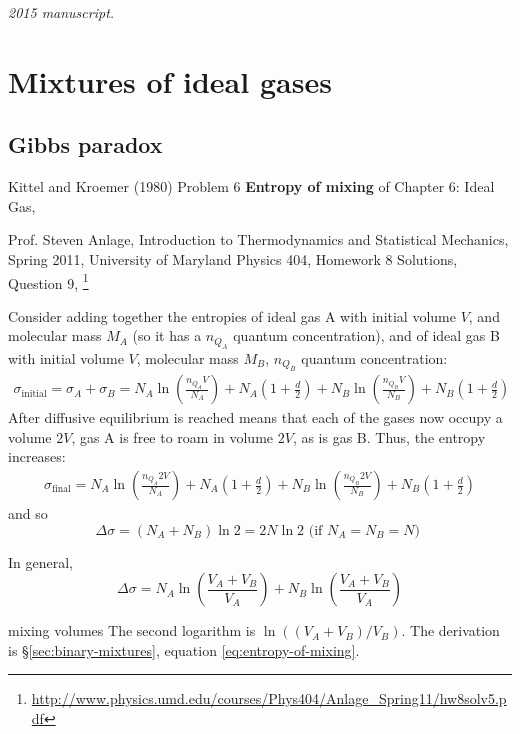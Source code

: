 \noindent\textit{2015 manuscript.}

\section{Mixtures of ideal gases}

\subsection{Gibbs paradox}


Kittel and Kroemer (1980) \cite{CKittelHKroemer1980} Problem 6 \textbf{Entropy of mixing} of Chapter 6: Ideal Gas,

Prof. Steven Anlage, Introduction to Thermodynamics and Statistical Mechanics, Spring 2011, University of Maryland Physics 404, Homework 8 Solutions, Question 9, \footnote{\url{http://www.physics.umd.edu/courses/Phys404/Anlage_Spring11/hw8solv5.pdf}}

Consider adding together the entropies of ideal gas A with initial volume $V$, and molecular mass $M_A$ (so it has a $n_{Q_A}$ quantum concentration), and of ideal gas B with initial volume $V$, molecular mass $M_B$, $n_{Q_B}$ quantum concentration:
\[
\begin{gathered}
  \sigma_{\text{initial}} = \sigma_A + \sigma_B = N_A \ln{ \left( \frac{n_{Q_A} V}{N_A} \right) } + N_A \left( 1 + \frac{d}{2} \right)  + N_B \ln{ \left( \frac{n_{Q_B} V}{N_B} \right) } + N_B \left( 1 + \frac{d}{2} \right) 
\end{gathered}
\]
After diffusive equilibrium is reached means that each of the gases now occupy a volume $2V$, gas A is free to roam in volume $2V$, as is gas B.  Thus, the entropy increases:
\[
\begin{gathered}
  \sigma_{\text{final}} = N_A \ln{ \left( \frac{n_{Q_A} 2V}{N_A} \right) } + N_A \left( 1 + \frac{d}{2} \right)  + N_B \ln{ \left( \frac{n_{Q_B} 2V}{N_B} \right) } + N_B \left( 1 + \frac{d}{2} \right) 
\end{gathered}
\]
and so
\[
\Delta \sigma = (N_A + N_B)\ln{2} = 2N\ln{2} \text{ (if $N_A=N_B=N$) }
\]

In general,
\[
\Delta \sigma = N_A \ln{ \left( \frac{V_A + V_B}{V_A} \right) } + N_B \ln{ \left( \frac{V_A + V_B}{V_A} \right) }
\]
\begin{correction}{mixing volumes}
The second logarithm is $\ln((V_A+V_B)/V_B)$.
The derivation is \S\ref{sec:binary-mixtures}, equation \eqref{eq:entropy-of-mixing}.
\end{correction}


